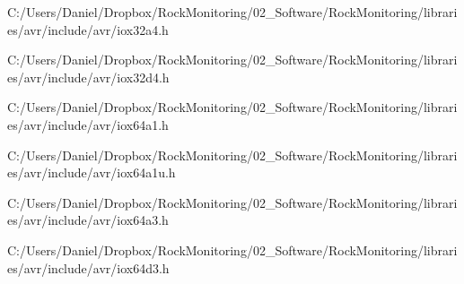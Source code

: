 \begin{DoxyCompactItemize}
C\+:/\+Users/\+Daniel/\+Dropbox/\+Rock\+Monitoring/02\+\_\+\+Software/\+Rock\+Monitoring/libraries/avr/include/avr/iox32a4.\+h\item 
C\+:/\+Users/\+Daniel/\+Dropbox/\+Rock\+Monitoring/02\+\_\+\+Software/\+Rock\+Monitoring/libraries/avr/include/avr/iox32d4.\+h\item 
C\+:/\+Users/\+Daniel/\+Dropbox/\+Rock\+Monitoring/02\+\_\+\+Software/\+Rock\+Monitoring/libraries/avr/include/avr/iox64a1.\+h\item 
C\+:/\+Users/\+Daniel/\+Dropbox/\+Rock\+Monitoring/02\+\_\+\+Software/\+Rock\+Monitoring/libraries/avr/include/avr/iox64a1u.\+h\item 
C\+:/\+Users/\+Daniel/\+Dropbox/\+Rock\+Monitoring/02\+\_\+\+Software/\+Rock\+Monitoring/libraries/avr/include/avr/iox64a3.\+h\item 
C\+:/\+Users/\+Daniel/\+Dropbox/\+Rock\+Monitoring/02\+\_\+\+Software/\+Rock\+Monitoring/libraries/avr/include/avr/iox64d3.\+h\end{DoxyCompactItemize}
